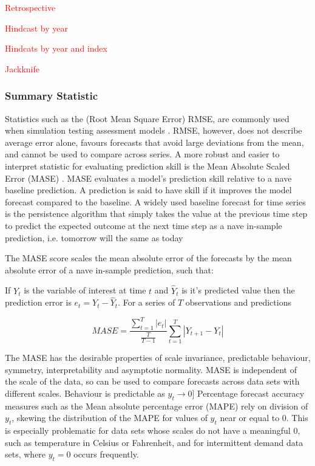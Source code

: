 \documentclass[a4paper]{article}
\newcommand{\laurie}{\textcolor{red}}
\newcommand{\laurie}{\textcolor{darkred}}
\begin{document}
\laurie{
\begin{description}
\item{Retrospective}
\item{Hindcast  by year}
\item{Hindcats by year and index}
\item{Jackknife}
\end{description}}


\subsubsection{Summary Statistic}

Statistics such as the (Root Mean Square Error) RMSE, are commonly used when simulation testing assessment models \citep[e.g.][]{horbowy2011,kell2016xval}. RMSE, however, does not describe average error alone, favours forecasts that avoid large deviations from the mean, and cannot be used to compare across series. A more robust and easier to interpret statistic for evaluating prediction skill is the Mean Absolute Scaled Error (MASE) \citep{Hyndman2006}. MASE evaluates a model’s prediction skill relative to a nave baseline prediction. A prediction is said to have skill if it improves the model forecast compared to the baseline. A widely used baseline forecast for time series is the persistence algorithm that simply takes the value at the previous time step to predict the expected outcome at the next time step as a nave in-sample prediction, i.e. tomorrow will the same as today 

The MASE score scales the mean absolute error of the forecasts by the mean absolute error of a nave in-sample prediction, such that:

If $Y_t$ is the variable of interest at time $t$ and ${\hat{Y}_t}$ is it's predicted value then the prediction error is $e_t = Y_t - \hat{Y}_t$. For a series of $T$ observations and predictions

\begin{equation} {MASE={\frac{\sum _{t=1}^{T}\left|e_{t}\right|}{\frac {T}{T-1}}\sum _{t=1}^{T}\left|Y_{t+1}-Y_{t}\right|}} \end{equation}

The MASE has the desirable properties of scale invariance, predictable behaviour, symmetry, interpretability and asymptotic normality. MASE is independent of the scale of the data, so can be used to compare forecasts across data sets with different scales. Behaviour is predictable as $y_{t}\rightarrow 0$] Percentage forecast accuracy measures such as the Mean absolute percentage error (MAPE) rely on division of $y_{t}$, skewing the distribution of the MAPE for values of $y_{t}$ near or equal to 0. This is especially problematic for data sets whose scales do not have a meaningful 0, such as temperature in Celsius or Fahrenheit, and for intermittent demand data sets, where $y_{t}=0$  occurs frequently.
\end{document}
